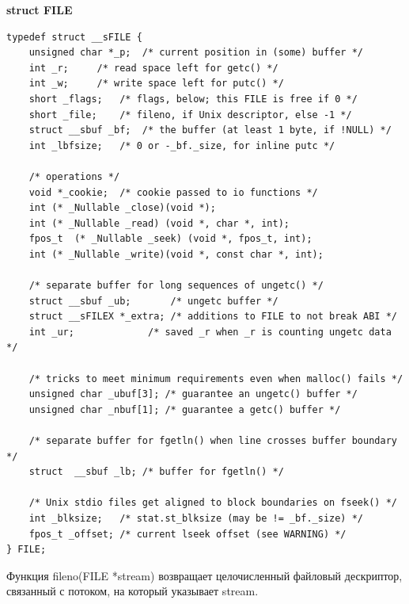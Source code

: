 \documentclass[a4paper,14pt]{extreport} %
\begin{document}
\textbf{struct FILE} 

\begin{lstlisting}
typedef struct __sFILE {
    unsigned char *_p;	/* current position in (some) buffer */
    int	_r;		/* read space left for getc() */
    int	_w;		/* write space left for putc() */
    short _flags;	/* flags, below; this FILE is free if 0 */
    short _file;	/* fileno, if Unix descriptor, else -1 */
    struct __sbuf _bf;	/* the buffer (at least 1 byte, if !NULL) */
    int	_lbfsize;	/* 0 or -_bf._size, for inline putc */

    /* operations */
    void *_cookie;	/* cookie passed to io functions */
    int	(* _Nullable _close)(void *);
    int	(* _Nullable _read) (void *, char *, int);
    fpos_t	(* _Nullable _seek) (void *, fpos_t, int);
    int	(* _Nullable _write)(void *, const char *, int);

    /* separate buffer for long sequences of ungetc() */
    struct __sbuf _ub;       /* ungetc buffer */
    struct __sFILEX *_extra; /* additions to FILE to not break ABI */
    int	_ur;		     /* saved _r when _r is counting ungetc data */

    /* tricks to meet minimum requirements even when malloc() fails */
    unsigned char _ubuf[3];	/* guarantee an ungetc() buffer */
    unsigned char _nbuf[1];	/* guarantee a getc() buffer */

    /* separate buffer for fgetln() when line crosses buffer boundary */
    struct	__sbuf _lb;	/* buffer for fgetln() */

    /* Unix stdio files get aligned to block boundaries on fseek() */
    int	_blksize;	/* stat.st_blksize (may be != _bf._size) */
    fpos_t _offset;	/* current lseek offset (see WARNING) */
} FILE;
\end{lstlisting}

Функция fileno(FILE *stream) возвращает целочисленный файловый дескриптор, связанный с потоком, на который указывает stream.
\end{document}

